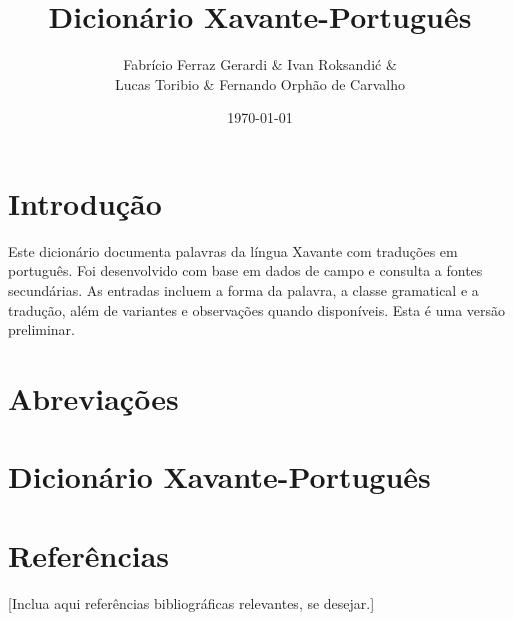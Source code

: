 \documentclass[12pt]{book}
\title{\textbf{Dicionário Xavante-Português}}
\author{Fabrício Ferraz Gerardi \& Ivan Roksandić \& \\ Lucas Toribio \& Fernando Orphão de Carvalho}
\date{\today}
\begin{document}
\frontmatter
\maketitle

\chapter*{Introdução}
Este dicionário documenta palavras da língua Xavante com traduções em português. Foi desenvolvido com base em dados de campo e consulta a fontes secundárias. As entradas incluem a forma da palavra, a classe gramatical e a tradução, além de variantes e observações quando disponíveis. Esta é uma versão preliminar.



\chapter*{Abreviações}


\frontmatter
\renewcommand{\contentsname}{Dicionário Xavante-Português} %
\tableofcontents

\mainmatter

\chapter*{Dicionário Xavante-Português}


\backmatter
\chapter*{Referências}
[Inclua aqui referências bibliográficas relevantes, se desejar.]
\end{document}
